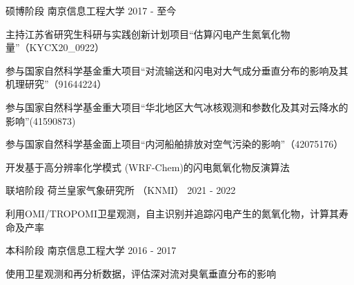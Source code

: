 

\begin{cventries}

  \cventry
    {硕博阶段} %
    {南京信息工程大学} %
    {2017 - 至今} %
    {}%
    {
      \begin{cvitems} %
        \item {主持江苏省研究生科研与实践创新计划项目“估算闪电产生氮氧化物量”（KYCX20\_0922）} %
        \item {参与国家自然科学基金重大项目“对流输送和闪电对大气成分垂直分布的影响及其机理研究”（91644224）} %
        \item {参与国家自然科学基金重大项目“华北地区大气冰核观测和参数化及其对云降水的影响”(41590873)} %
        \item {参与国家自然科学基金面上项目“内河船舶排放对空气污染的影响”（42075176）} %
        \item {开发基于高分辨率化学模式 (WRF-Chem)的闪电氮氧化物反演算法} %
      \end{cvitems}
    }

  \cventry
    {联培阶段} %
    {荷兰皇家气象研究所 （KNMI）} %
    {2021 - 2022} %
    {}%
    {
      \begin{cvitems} %
        \item {利用OMI/TROPOMI卫星观测，自主识别并追踪闪电产生的氮氧化物，计算其寿命及产率}
      \end{cvitems}
    }

  \cventry
    {本科阶段} %
    {南京信息工程大学} %
    {2016 - 2017} %
    {}%
    {
      \begin{cvitems} %
        \item {使用卫星观测和再分析数据，评估深对流对臭氧垂直分布的影响}
      \end{cvitems}
    }


\end{cventries}
